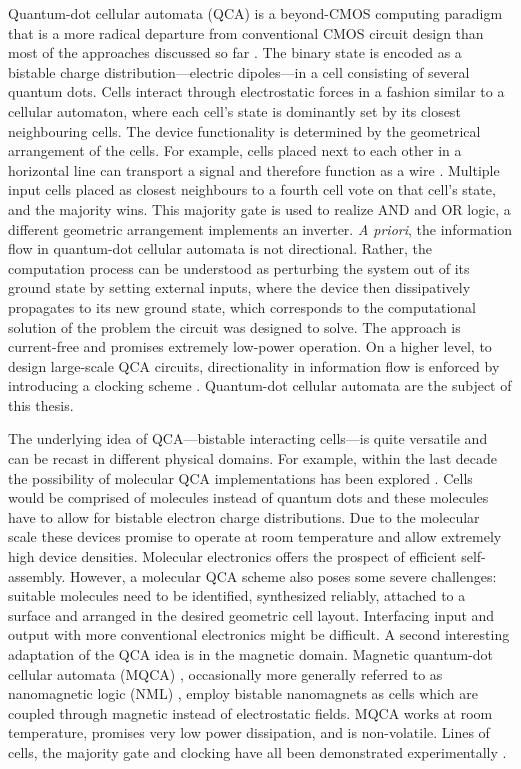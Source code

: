 Quantum-dot cellular automata (QCA) is a beyond-CMOS computing paradigm that is
a more radical departure from conventional CMOS circuit design than most of the
approaches discussed so far \cite{lent1993quantum}. The binary state is encoded
as a bistable charge distribution---electric dipoles---in a cell consisting of
several quantum dots. Cells interact through electrostatic forces in a fashion
similar to a cellular automaton, where each cell's state is dominantly set by
its closest neighbouring cells. The device functionality is determined by the
geometrical arrangement of the cells. For example, cells placed next to each other in
a horizontal line can transport a signal and therefore function as a wire
\cite{lent1993lines}. Multiple input cells placed as closest neighbours to a
fourth cell vote on that cell's state, and the majority wins. This majority gate
is used to realize AND and OR logic, a different geometric arrangement
implements an inverter. \emph{A priori}, the information flow in quantum-dot
cellular automata is not directional. Rather, the computation process can be
understood as perturbing the system out of its ground state by setting external
inputs, where the device then dissipatively propagates to its new ground state,
which corresponds to the computational solution of the problem the circuit was
designed to solve. The approach is current-free and promises extremely low-power
operation. On a higher level, to design large-scale QCA circuits, directionality
in information flow is enforced by introducing a clocking scheme
\cite{lent1997device}. Quantum-dot cellular automata are the subject of this
thesis.

The underlying idea of QCA---bistable interacting cells---is quite versatile and
can be recast in different physical domains. For example, within the last decade
the possibility of molecular QCA implementations has been explored
\cite{lent2000bypassing} \cite{lent2003molecular}. Cells would be comprised of
molecules instead of quantum dots and these molecules have to allow for bistable
electron charge distributions. Due to the molecular scale these devices promise
to operate at room temperature and allow extremely high device densities.
Molecular electronics offers the prospect of efficient self-assembly. However, a
molecular QCA scheme also poses some severe challenges: suitable molecules need
to be identified, synthesized reliably, attached to a surface and arranged in
the desired geometric cell layout. Interfacing input and output with more
conventional electronics might be difficult. A second interesting adaptation of
the QCA idea is in the magnetic domain. Magnetic quantum-dot cellular automata
(MQCA) \cite{cowburn2000room} \cite{bernstein2005magnetic}, occasionally more
generally referred to as nanomagnetic logic (NML) \cite{cavin2012science},
employ bistable nanomagnets as cells which are coupled through magnetic instead
of electrostatic fields. MQCA works at room temperature, promises very low power
dissipation, and is non-volatile. Lines of cells, the majority gate and clocking
have all been demonstrated experimentally \cite{imre2006majority}
\cite{alam2007clocking} \cite{alam2012chip}.

